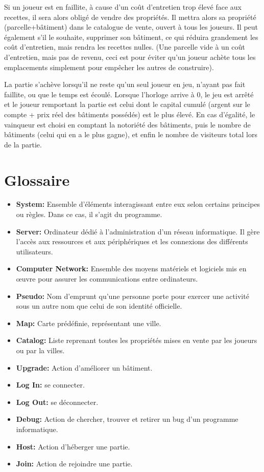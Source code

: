 \documentclass[a4paper,11pt]{report}
\begin{document}
Si un joueur est en faillite, à cause d'un coût d'entretien trop élevé face aux recettes, il sera alors obligé de vendre des propriétés. Il mettra alors sa propriété (parcelle+bâtiment) dans le catalogue de vente, ouvert à tous les joueurs.
Il peut également s'il le souhaite, supprimer son bâtiment, ce qui réduira grandement les coût d'entretien, mais rendra les recettes nulles. (Une parcelle vide à un coût d'entretien, mais pas de revenu, ceci est pour éviter qu'un joueur achète tous les emplacements simplement pour empêcher les autres de construire).

La partie s'achève lorsqu'il ne reste qu'un seul joueur en jeu, n'ayant pas fait faillite, ou que le temps est écoulé. Lorsque l'horloge arrive à 0, le jeu est arrêté et le joueur remportant la partie est celui dont le capital cumulé (argent sur le compte + prix réel des bâtiments possédés) est le plus élevé. En cas d'égalité, le vainqueur est choisi en comptant la notoriété des bâtiments, puis le nombre de bâtiments (celui qui en a le plus gagne), et enfin le nombre de visiteurs total lors de la partie.

\newpage
\section{Glossaire}
\begin{itemize}
 \item \textbf{System:} Ensemble d'éléments interagissant entre eux selon certains principes ou règles. Dans ce cas, il s’agit du programme.
 \item \textbf{Server:} Ordinateur dédié à l'administration d'un réseau informatique. Il gère l'accès aux ressources et aux périphériques et les connexions des différents utilisateurs.
 \item \textbf{Computer Network:} Ensemble des moyens matériels et logiciels mis en œuvre pour assurer les communications entre ordinateurs.
 \item \textbf{Pseudo:} Nom d'emprunt qu'une personne porte pour exercer une activité sous un autre nom que celui de son identité officielle.
 \item \textbf{Map:} Carte prédéfinie, représentant une ville.
 \item \textbf{Catalog:} Liste reprenant toutes les propriétés mises en vente par les joueurs ou par la villes.
 \item \textbf{Upgrade:} Action d'améliorer un bâtiment.
 \item \textbf{Log In:} se connecter.
 \item \textbf{Log Out:} se déconnecter.
 \item \textbf{Debug:} Action de chercher, trouver et retirer un bug d’un programme informatique.
 \item \textbf{Host:} Action d'héberger une partie.
 \item \textbf{Join:} Action de rejoindre une partie.
\end{itemize}
	
\end{document}
